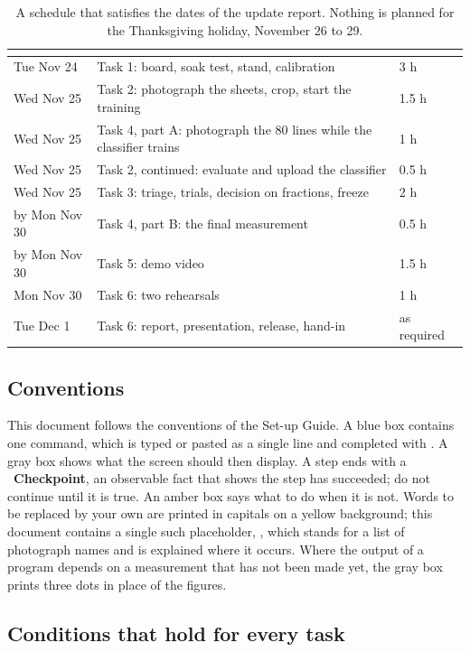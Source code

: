 \begin{table}[H]
\centering
\begin{tabular}{C{2.5cm}L{6.2cm}C{2.4cm}}
\toprule
{} &  &  \\
\midrule
Tue Nov 24 & Task 1: board, soak test, stand, calibration & 3 h \\
Wed Nov 25 & Task 2: photograph the sheets, crop, start the training & 1.5 h \\
Wed Nov 25 & Task 4, part A: photograph the 80 lines while the classifier trains & 1 h \\
Wed Nov 25 & Task 2, continued: evaluate and upload the classifier & 0.5 h \\
Wed Nov 25 & Task 3: triage, trials, decision on fractions, freeze & 2 h \\
by Mon Nov 30 & Task 4, part B: the final measurement & 0.5 h \\
by Mon Nov 30 & Task 5: demo video & 1.5 h \\
Mon Nov 30 & Task 6: two rehearsals & 1 h \\
Tue Dec 1 & Task 6: report, presentation, release, hand-in & as required \\
\bottomrule
\end{tabular}
\caption{A schedule that satisfies the dates of the update report. Nothing is planned for the
Thanksgiving holiday, November 26 to 29.}
\label{tab:order}
\end{table}

\subsection{Conventions}

This document follows the conventions of the Set-up Guide. A blue box contains one command,
which is typed or pasted as a single line and completed with . A gray box shows
what the screen should then display. A step ends with a \ok~\textbf{Checkpoint}, an observable
fact that shows the step has succeeded; do not continue until it is true. An amber box says
what to do when it is not. Words to be replaced by your own are printed in capitals on a
yellow background; this document contains a single such placeholder, , which stands
for a list of photograph names and is explained where it occurs. Where the output of a program
depends on a measurement that has not been made yet, the gray box prints three dots in place
of the figures.

\subsection{Conditions that hold for every task}


